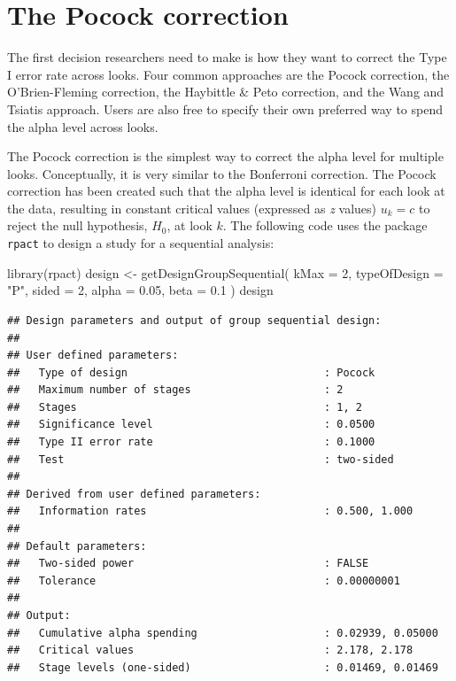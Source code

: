 \documentclass[
  oneside]{krantz}
\makeatletter
\newenvironment{Shaded}{\begin{snugshade}}{\end{snugshade}}
\newcommand{\AttributeTok}[1]{\textcolor[rgb]{0.61,0.61,0.61}{#1}}
\newcommand{\DecValTok}[1]{\textcolor[rgb]{0.06,0.06,0.06}{#1}}
\newcommand{\FloatTok}[1]{\textcolor[rgb]{0.06,0.06,0.06}{#1}}
\newcommand{\FunctionTok}[1]{\textcolor[rgb]{0,0,0}{#1}}
\newcommand{\NormalTok}[1]{#1}
\newcommand{\OtherTok}[1]{\textcolor[rgb]{0.37,0.37,0.37}{#1}}
\newcommand{\StringTok}[1]{\textcolor[rgb]{0.5,0.5,0.5}{#1}}
\newenvironment{kframe}{%
\medskip{}
\setlength{\fboxsep}{.8em}
 \def\at@end@of@kframe{}%
 \ifinner\ifhmode%
  \def\at@end@of@kframe{\end{minipage}}%
  \begin{minipage}{\columnwidth}%
 \fi\fi%
 \def\FrameCommand##1{\hskip\@totalleftmargin \hskip-\fboxsep
 \colorbox{shadecolor}{##1}\hskip-\fboxsep
     \hskip-\linewidth \hskip-\@totalleftmargin \hskip\columnwidth}%
 \MakeFramed {\advance\hsize-\width
   \@totalleftmargin\z@ \linewidth\hsize
   \@setminipage}}%
 {\par\unskip\endMakeFramed%
 \at@end@of@kframe}
\renewenvironment{Shaded}{\begin{kframe}}{\end{kframe}}
\makeatother
\begin{document}
\hypertarget{the-pocock-correction}{%
\section{The Pocock correction}\label{the-pocock-correction}}

The first decision researchers need to make is how they want to correct the Type I error rate across looks. Four common approaches are the Pocock correction, the O'Brien-Fleming correction, the Haybittle \& Peto correction, and the Wang and Tsiatis approach. Users are also free to specify their own preferred way to spend the alpha level across looks.

The Pocock correction is the simplest way to correct the alpha level for multiple looks. Conceptually, it is very similar to the Bonferroni correction. The Pocock correction has been created such that the alpha level is identical for each look at the data, resulting in constant critical values (expressed as \emph{z} values) \(u_k = c\) to reject the null hypothesis, \(H_0\), at look \(k\). The following code uses the package \texttt{rpact} to design a study for a sequential analysis:

\begin{Shaded}
\begin{Highlighting}[]
\FunctionTok{library}\NormalTok{(rpact)}
\NormalTok{design }\OtherTok{\textless{}{-}} \FunctionTok{getDesignGroupSequential}\NormalTok{(}
  \AttributeTok{kMax =} \DecValTok{2}\NormalTok{,}
  \AttributeTok{typeOfDesign =} \StringTok{"P"}\NormalTok{,}
  \AttributeTok{sided =} \DecValTok{2}\NormalTok{,}
  \AttributeTok{alpha =} \FloatTok{0.05}\NormalTok{,}
  \AttributeTok{beta =} \FloatTok{0.1}
\NormalTok{)}
\NormalTok{design}
\end{Highlighting}
\end{Shaded}

\begin{verbatim}
## Design parameters and output of group sequential design:
## 
## User defined parameters:
##   Type of design                               : Pocock 
##   Maximum number of stages                     : 2 
##   Stages                                       : 1, 2 
##   Significance level                           : 0.0500 
##   Type II error rate                           : 0.1000 
##   Test                                         : two-sided 
## 
## Derived from user defined parameters:
##   Information rates                            : 0.500, 1.000 
## 
## Default parameters:
##   Two-sided power                              : FALSE 
##   Tolerance                                    : 0.00000001 
## 
## Output:
##   Cumulative alpha spending                    : 0.02939, 0.05000 
##   Critical values                              : 2.178, 2.178 
##   Stage levels (one-sided)                     : 0.01469, 0.01469
\end{verbatim}
\end{document}
